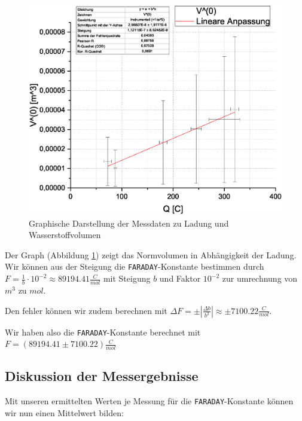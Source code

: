 \documentclass[10pt,a4paper]{article}
\begin{document}
\begin{figure}[H]
\centering
\includegraphics[scale=0.5]{Graph}
\caption[Graph: Ladung \& Wasserstoffvolumen]{Graphische Darstellung der Messdaten zu Ladung und Wasserstoffvolumen}
\label{fig:LadVol}
\end{figure}

\begin{flushleft}
Der Graph (Abbildung \ref{fig:LadVol}) zeigt das Normvolumen in Abhängigkeit der Ladung. Wir können aus der Steigung die \texttt{FARADAY}-Konstante bestimmen durch $F = \frac{1}{b} \cdot 10^{-2} \approx 89194.41 \frac{C}{mol}$ mit Steigung $b$ und Faktor $10^{-2}$ zur umrechnung von $m^3$ zu $mol$.

Den fehler können wir zudem berechnen mit $\Delta F = \pm |\frac{\Delta b}{b^2}| \approx \pm 7100.22 \frac{C}{mol}$.

Wir haben also die \texttt{FARADAY}-Konstante berechnet mit $F = (89194.41 \pm 7100.22) \frac{C}{mol}$
\end{flushleft}

\subsection{Diskussion der Messergebnisse}
\begin{flushleft}
Mit unseren ermittelten Werten je Messung für die \texttt{FARADAY}-Konstante können wir nun einen Mittelwert bilden:
\end{flushleft}
\end{document}
